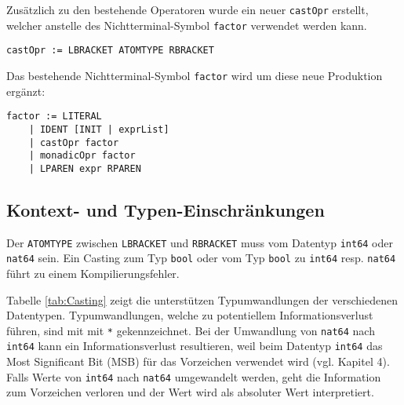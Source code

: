 \documentclass[10pt, a4paper, twocolumn]{article} %
\begin{document}
Zusätzlich zu den bestehende Operatoren wurde ein neuer \texttt{castOpr} erstellt, welcher anstelle des Nichtterminal-Symbol \texttt{factor} verwendet werden kann.
\begin{lstlisting}[backgroundcolor = \color{lightgray},
xleftmargin = 0.05cm,
framexleftmargin = 0.05em]
    castOpr := LBRACKET ATOMTYPE RBRACKET
\end{lstlisting}
Das bestehende Nichtterminal-Symbol \texttt{factor} wird um diese neue Produktion ergänzt:
\begin{lstlisting}[backgroundcolor = \color{lightgray},
xleftmargin = 0.05cm,
framexleftmargin = 0.05em]
    factor := LITERAL
    | IDENT [INIT | exprList]
    | castOpr factor
    | monadicOpr factor
    | LPAREN expr RPAREN
\end{lstlisting}

\subsection{Kontext- und Typen-Einschränkungen}
Der \texttt{ATOMTYPE} zwischen \texttt{LBRACKET} und \texttt{RBRACKET} muss vom Datentyp \texttt{int64} oder \texttt{nat64} sein.
Ein Casting zum Typ \texttt{bool} oder vom Typ \texttt{bool} zu \texttt{int64} resp. \texttt{nat64} führt zu einem Kompilierungsfehler.

Tabelle \ref{tab:Casting} zeigt die unterstützen Typumwandlungen der verschiedenen Datentypen.
Typumwandlungen, welche zu potentiellem Informationsverlust führen, sind mit mit \texttt{*} gekennzeichnet.
Bei der Umwandlung von \texttt{nat64} nach \texttt{int64} kann ein Informationsverlust resultieren, weil beim Datentyp \texttt{int64} das Most Significant Bit (MSB) für das Vorzeichen verwendet wird (vgl. Kapitel 4). %
Falls Werte von \texttt{int64} nach \texttt{nat64} umgewandelt werden, geht die Information zum Vorzeichen verloren und der Wert wird als absoluter Wert interpretiert.
\begin{table}[h]
    \tiny
    \centering
    \caption{Casting zwischen Datentypen}
    \label{tab:Casting}
\end{table}
\end{document}
